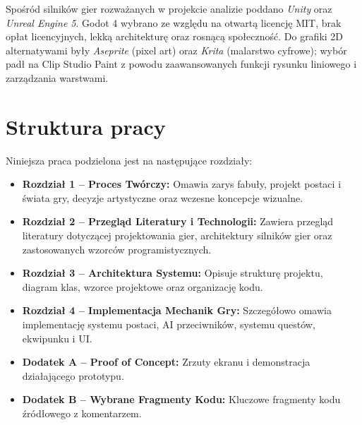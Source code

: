 Spośród silników gier rozważanych w projekcie analizie poddano \textit{Unity} oraz \textit{Unreal Engine 5}. Godot 4 wybrano ze względu na otwartą licencję MIT, brak opłat licencyjnych, lekką architekturę oraz rosnącą społeczność. Do grafiki 2D alternatywami były \textit{Aseprite} (pixel art) oraz \textit{Krita} (malarstwo cyfrowe); wybór padł na Clip Studio Paint z powodu zaawansowanych funkcji rysunku liniowego i zarządzania warstwami.

\section{Struktura pracy}

Niniejsza praca podzielona jest na następujące rozdziały:

\begin{itemize}
    \item \textbf{Rozdział 1 – Proces Twórczy:} Omawia zarys fabuły, projekt postaci i świata gry, decyzje artystyczne oraz wczesne koncepcje wizualne.
    \item \textbf{Rozdział 2 – Przegląd Literatury i Technologii:} Zawiera przegląd literatury dotyczącej projektowania gier, architektury silników gier oraz zastosowanych wzorców programistycznych.
    \item \textbf{Rozdział 3 – Architektura Systemu:} Opisuje strukturę projektu, diagram klas, wzorce projektowe oraz organizację kodu.
    \item \textbf{Rozdział 4 – Implementacja Mechanik Gry:} Szczegółowo omawia implementację systemu postaci, AI przeciwników, systemu questów, ekwipunku i UI.
    \item \textbf{Dodatek A – Proof of Concept:} Zrzuty ekranu i demonstracja działającego prototypu.
    \item \textbf{Dodatek B – Wybrane Fragmenty Kodu:} Kluczowe fragmenty kodu źródłowego z komentarzem.
\end{itemize}
